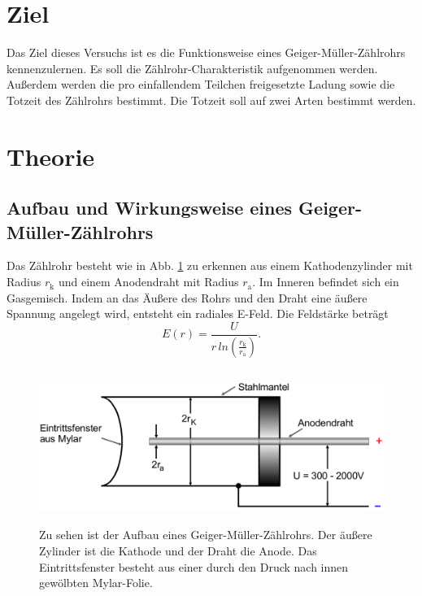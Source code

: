 \section{Ziel}
Das Ziel dieses Versuchs ist es die Funktionsweise eines Geiger-Müller-Zählrohrs kennenzulernen. Es soll die Zählrohr-Charakteristik aufgenommen werden.
Außerdem werden die pro einfallendem Teilchen freigesetzte Ladung sowie die Totzeit des Zählrohrs bestimmt. Die Totzeit soll auf zwei Arten bestimmt werden.

\section{Theorie}
\label{sec:Theorie}

\subsection{Aufbau und Wirkungsweise eines Geiger-Müller-Zählrohrs}

Das Zählrohr besteht wie in Abb. \ref{fig:zaehlrohr} zu erkennen aus einem Kathodenzylinder mit Radius $r_\text{k}$ und einem Anodendraht mit Radius $r_\text{a}$. Im Inneren befindet sich ein Gasgemisch. Indem an das Äußere des Rohrs und den Draht eine äußere Spannung angelegt wird, entsteht ein radiales E-Feld. Die Feldstärke beträgt 
\begin{equation*}
    E(r) = \frac{U}{r \, ln \left(\frac{r_\text{k}}{r_\text{a}} \right)}.
    \label{eqn:feldstärke}
\end{equation*}


\begin{figure}
    \centering
    \includegraphics[width=12cm, height=5cm]{build/zaehlrohr.png}
    \caption{Zu sehen ist der Aufbau eines Geiger-Müller-Zählrohrs. Der äußere Zylinder ist die Kathode und der Draht die Anode. Das Eintrittsfenster besteht aus einer durch den Druck nach innen gewölbten Mylar-Folie. \cite{V703}}
    \label{fig:zaehlrohr}
\end{figure}

